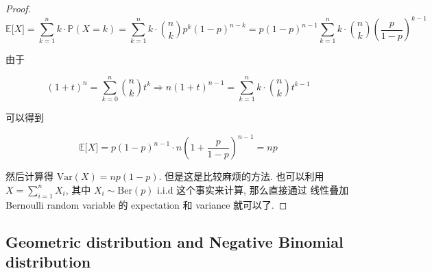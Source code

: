 \begin{proof}

\[\mathbb{E}\lbrack\mathit{X}\rbrack = \sum\limits_{\mathit{k} = 1}^{\mathit{n}}\mathit{k} \cdot \mathbb{P}(\mathit{X} = \mathit{k}) = \sum\limits_{\mathit{k} = 1}^{\mathit{n}}\mathit{k} \cdot \binom{\mathit{n}}{\mathit{k}}\mathit{p}^{\mathit{k}}(1 - \mathit{p})^{\mathit{n} - \mathit{k}} = \mathit{p}(1 - \mathit{p})^{\mathit{n} - 1}\sum\limits_{\mathit{k} = 1}^{\mathit{n}}\mathit{k} \cdot \binom{\mathit{n}}{\mathit{k}}(\frac{\mathit{p}}{1 - \mathit{p}})^{\mathit{k} - 1}\]

由于

\[(1 + \mathit{t})^{\mathit{n}} = \sum\limits_{\mathit{k} = 0}^{\mathit{n}}\binom{\mathit{n}}{\mathit{k}}\mathit{t}^{\mathit{k}}\Longrightarrow\mathit{n}(1 + \mathit{t})^{\mathit{n} - 1} = \sum\limits_{\mathit{k} = 1}^{\mathit{n}}\mathit{k} \cdot \binom{\mathit{n}}{\mathit{k}}\mathit{t}^{\mathit{k} - 1}\]

可以得到

\[\mathbb{E}\lbrack\mathit{X}\rbrack = \mathit{p}(1 - \mathit{p})^{\mathit{n} - 1} \cdot \mathit{n}(1 + \frac{\mathit{p}}{1 - \mathit{p}})^{\mathit{n} - 1} = \mathit{n}\mathit{p}\]

然后计算得 \(\text{Var}(\mathit{X}) = \mathit{n}\mathit{p}(1 - \mathit{p})\). 但是这是比较麻烦的方法. 也可以利用 \(\mathit{X} = \sum_{\mathit{i} = 1}^{\mathit{n}}\mathit{X}_{\mathit{i}}\), 其中 \(\mathit{X}_{\mathit{i}} \sim \text{Ber}(\mathit{p})\) i.i.d 这个事实来计算, 那么直接通过 线性叠加 Bernoulli random variable 的 expectation 和 variance 就可以了.

\end{proof}

\subsection{Geometric distribution and Negative Binomial distribution}\label{geometric-distribution-and-negative-binomial-distribution}

